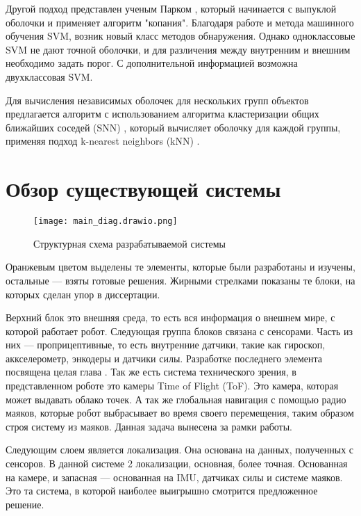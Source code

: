 Другой подход представлен ученым Парком \cite{parkNewConcaveHull2012}, который начинается с выпуклой оболочки и применяет алгоритм "копания". Благодаря работе \cite{j.a.leonardUsingRadialBasis1992} и  метода машинного обучения  SVM, возник новый класс методов обнаружения. Однако одноклассовые SVM не дают точной оболочки, и для различения между внутренним и внешним необходимо задать порог. С дополнительной информацией возможна двухклассовая SVM. 

Для вычисления независимых оболочек для нескольких групп объектов предлагается алгоритм с использованием алгоритма кластеризации общих ближайших соседей (SNN) , который вычисляет оболочку для каждой группы, применяя подход k-nearest neighbors (kNN) \cite{moreiraConcaveHullKnearest2007,ertozNewSharedNearest2002,chauBorderSamplesDetection2011,xiaBORDEREfficientComputation2006}.

\section{Обзор существующей системы}
\begin{figure}[H]
    \centering\texttt{[image: main\_diag.drawio.png]}
    \caption{Структурная схема разрабатываемой системы}
    \label{fig:diag_system.png}
\end{figure}

Оранжевым цветом выделены те элементы, которые были разработаны и изучены, остальные --- взяты готовые решения. Жирными стрелками показаны те блоки, на которых сделан упор в диссертации.

Верхний блок это внешняя среда, то есть вся информация о внешнем мире, с которой работает робот. Следующая группа блоков связана с сенсорами. Часть из них --- проприцептивные, то есть внутренние датчики, такие как гироскоп, аккселерометр, энкодеры и датчики силы. Разработке последнего элемента посвящена целая глава . Так же есть система технического зрения, в представленном роботе это камеры Time of Flight (ToF). Это камера, которая может выдавать облако точек. А так же глобальная навигация с помощью радио маяков, которые робот выбрасывает во время своего перемещения, таким образом строя систему из маяков. Данная задача вынесена за рамки работы.

Следующим слоем является локализация. Она основана на данных, полученных с сенсоров. В данной системе 2 локализации, основная, более точная. Основанная на камере, и запасная --- основанная на IMU, датчиках силы и системе маяков. Это та система, в которой наиболее выигрышно смотрится предложенное решение.

